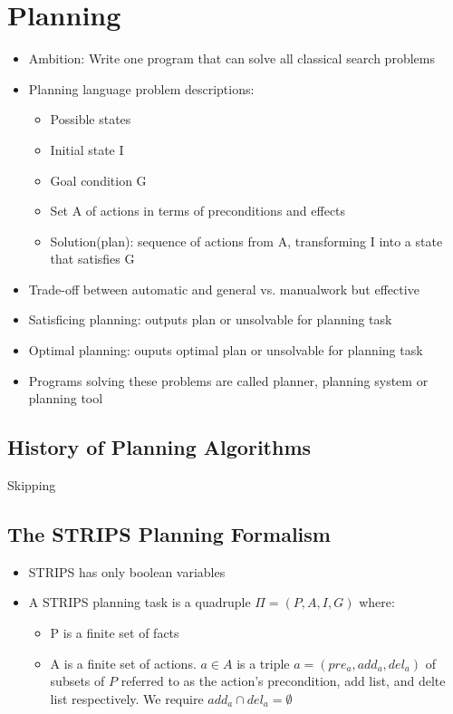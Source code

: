\documentclass{scrartcl}
\begin{document}
\section{Planning}
\begin{itemize}
    \item
        Ambition: Write one program that can solve all classical search problems
    \item
        Planning language problem descriptions: 
        \begin{itemize}
            \item
                Possible states
            \item
                Initial state I
            \item
                Goal condition G
            \item
                Set A of actions in terms of preconditions and effects
            \item
                Solution(plan): sequence of actions from A, transforming I into a state that satisfies G
        \end{itemize}
    \item
        Trade-off between automatic and general vs. manualwork but effective
    \item
        Satisficing planning: outputs plan or unsolvable for planning task
    \item
        Optimal planning: ouputs optimal plan or unsolvable for planning task
    \item
        Programs solving these problems are called planner, planning system or planning tool
\end{itemize}
\subsection{History of Planning Algorithms}
Skipping
\subsection{The STRIPS Planning Formalism}
\begin{itemize}
    \item
        STRIPS has only boolean variables
    \item
        A STRIPS planning task is a quadruple $\Pi = (P, A, I, G)$ where:
        \begin{itemize}
            \item
                P is a finite set of facts
            \item
                A is a finite set of actions. $a \in A$ is a triple $a=(pre_a, add_a, del_a)$ of subsets of $P$ referred to as the action's precondition, add list, and delte list respectively. We require $add_a \cap del_a = \emptyset$
        \end{itemize}
\end{itemize}
\end{document}
